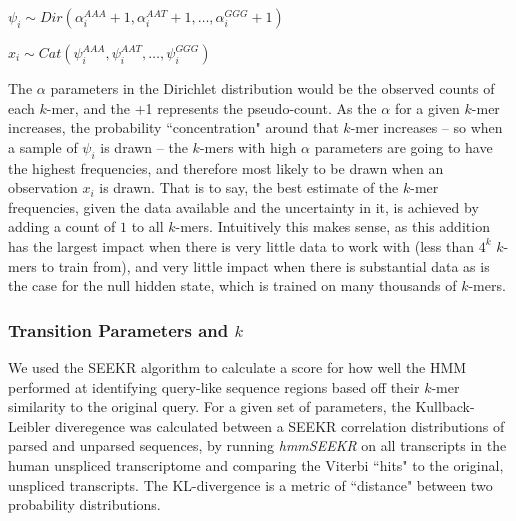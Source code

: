 \begin{center}
    $\psi_i \sim Dir(\alpha_i^{AAA}+1,\alpha_i^{AAT}+1,\dots,\alpha_i^{GGG}+1)$
    
    $x_i \sim Cat(\psi_i^{AAA},\psi_i^{AAT},\dots,\psi_i^{GGG})$
\end{center}

The $\alpha$ parameters in the Dirichlet distribution would be the observed counts of each $k$-mer, and the +1 represents the pseudo-count. As the $\alpha$ for a given $k$-mer increases, the probability ``concentration" around that $k$-mer increases -- so when a sample of $\psi_i$ is drawn -- the $k$-mers with high $\alpha$ parameters are going to have the highest frequencies, and therefore most likely to be drawn when an observation $x_i$ is drawn. That is to say, the best estimate of the $k$-mer frequencies, given the data available and the uncertainty in it, is achieved by adding a count of $1$ to all $k$-mers. Intuitively this makes sense, as this addition has the largest impact when there is very little data to work with (less than $4^k$ $k$-mers to train from), and very little impact when there is substantial data as is the case for the null hidden state, which is trained on many thousands of $k$-mers.

\subsubsection{Transition Parameters and $k$}

We used the SEEKR algorithm to calculate a score for how well the HMM performed at identifying query-like sequence regions based off their $k$-mer similarity to the original query.  For a given set of parameters, the Kullback-Leibler diveregence was calculated between a SEEKR correlation distributions of parsed and unparsed sequences, by running \emph{hmmSEEKR} on all transcripts in the human unspliced transcriptome and comparing the Viterbi ``hits" to the original, unspliced transcripts. The KL-divergence is a metric of ``distance" between two probability distributions. 

